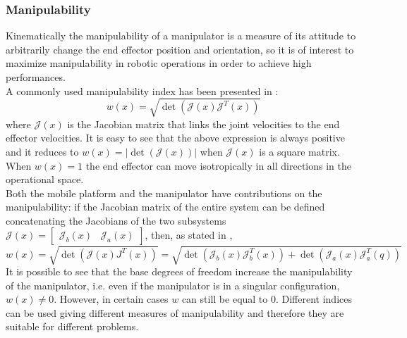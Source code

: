 \subsubsection{Manipulability} 
Kinematically the manipulability of a manipulator is a measure of its attitude to arbitrarily change the end effector position and orientation, so it is of interest to maximize manipulability in robotic operations in order to achieve high performances.\\
A commonly used manipulability index has been presented in \cite{yoshikawa1983} \cite{yoshikawa1985}:
\begin{equation}
w(x) = \sqrt{\det\left(\mathcal{J}(x)\mathcal{J}^T(x)\right)}
\end{equation}
where $\mathcal{J}(x)$ is the Jacobian matrix that links the joint velocities to the end effector velocities. It is easy to see that the above expression is always positive and it reduces to $w(x)=\left| \det\left(\mathcal{J}(x)\right)\right| $ when $\mathcal{J}(x)$ is a square matrix. When $w(x)=1$ the end effector can move isotropically in all directions in the operational space.\\
Both the mobile platform and the manipulator have contributions on the manipulability: if the Jacobian matrix of the entire system can be defined concatenating the Jacobians of the two subsystems $\mathcal{J}(x)=\left[\begin{matrix}\mathcal{J}_b(x)&\mathcal{J}_a(x)\end{matrix}\right]$, then, as stated in \cite{seraji1993},
\begin{equation}
w(x) = \sqrt{\det\left(\mathcal{J}(x)J^T(x)\right)}=\sqrt{\det\left(\mathcal{J}_b(x)\mathcal{J}_b^T(x)\right)+\det\left(\mathcal{J}_a(x)\mathcal{J}_a^T(q)\right)}
\end{equation}
It is possible to see that the base degrees of freedom increase the manipulability of the manipulator, i.e. even if the manipulator is in a singular configuration, $w(x)\neq0$. However, in certain cases $w$ can still be equal to 0. Different indices can be used giving different measures of manipulability and therefore they are suitable for different problems.

